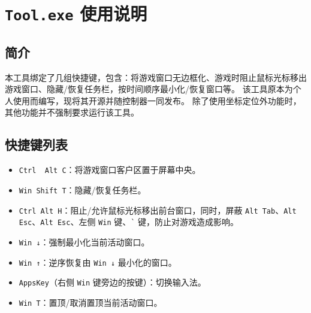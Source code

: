 \section{\lstinline{Tool.exe} 使用说明}
\label{appendix_00}

\subsection{简介}

本工具绑定了几组快捷键，包含：将游戏窗口无边框化、游戏时阻止鼠标光标移出游戏窗口、隐藏/恢复任务栏，按时间顺序最小化/恢复窗口等。
该工具原本为个人使用而编写，现将其开源并随控制器一同发布。
除了使用坐标定位外功能时，其他功能并不强制要求运行该工具。

\subsection{快捷键列表}

\begin{itemize}
    \item \lstinline{Ctrl  Alt C}：将游戏窗口客户区置于屏幕中央。
    \item \lstinline{Win Shift T}：隐藏/恢复任务栏。
    \item \lstinline{Ctrl Alt H}：阻止/允许鼠标光标移出前台窗口，同时，屏蔽 \lstinline{Alt Tab}、\lstinline{Alt Esc}、\lstinline{Alt Esc}、左侧 \lstinline{Win} 键、\lstinline{`} 键，防止对游戏造成影响。
    \item \lstinline{Win ↓}：强制最小化当前活动窗口。
    \item \lstinline{Win ↑}：逆序恢复由 \lstinline{Win ↓} 最小化的窗口。
    \item \lstinline{AppsKey}（右侧 \lstinline{Win} 键旁边的按键）：切换输入法。
    \item \lstinline{Win T}：置顶/取消置顶当前活动窗口。
\end{itemize}